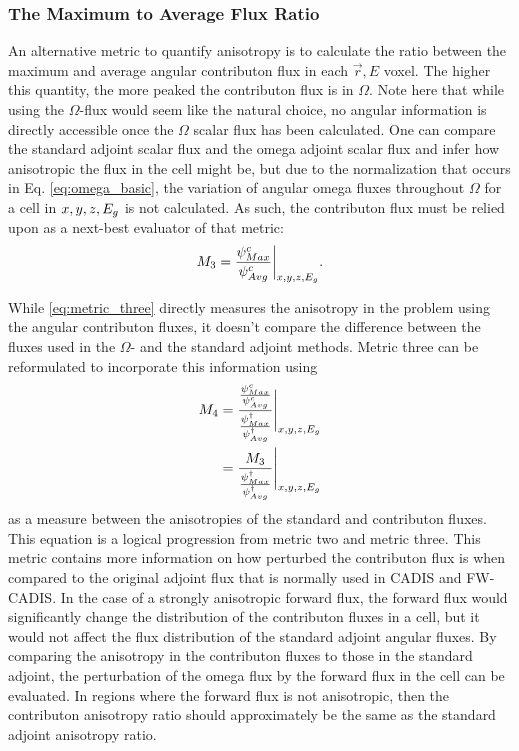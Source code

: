 \subsubsection{The Maximum to Average Flux Ratio}

An alternative metric to quantify anisotropy is to calculate the ratio between
the maximum and average angular contributon flux in each $\vec{r} , E$ voxel.
The higher this quantity, the more peaked the contributon flux is in $\Omega$.
Note here that while using the $\Omega$-flux would seem like the natural choice,
no angular information is directly accessible once the $\Omega$ scalar flux has
been calculated. One can compare the standard adjoint scalar flux and the omega
adjoint scalar flux and infer how anisotropic the flux in the cell might be, but
due to the normalization that occurs in Eq. \eqref{eq:omega_basic}, the
variation of angular omega fluxes throughout $\Omega$ for a cell
in $x,y,z,E_g$ is not
calculated. As such, the contributon flux must be relied
upon as a next-best evaluator of that metric:
%
\begin{equation}
  M_{3} = \frac{\psi^{c}_{Max}}{\psi^{c}_{
          Avg}}\bigg\rvert_{x,y,z,E_g}  .
  \label{eq:metric_three}
\end{equation}

While \eqref{eq:metric_three} directly measures the anisotropy in the problem using
the angular contributon fluxes, it doesn't compare the difference
between the fluxes used
in the $\Omega$-  and the standard adjoint methods. Metric three
can be
reformulated to incorporate this information using
%
\begin{equation}
  \begin{split}
    M_{4} & = \frac{\frac{\psi^{c}_{Max}}{\psi^{c}_{
                  Avg}}}{\frac{\psi^{\dagger}_{
                  Max}}{\psi^{\dagger}_{Avg}}} \Bigg\rvert_{x,y,z,E_g} \\
          & = \frac{M_{3}}{\frac{\psi^{\dagger}_{Max}}
                  {\psi^{\dagger}_{Avg}}} \Bigg\rvert_{x,y,z,E_g}
  \end{split}
  \label{eq:metric_four}
\end{equation}
%
as a measure between the anisotropies of the standard and contributon fluxes.
This equation is a logical progression from metric two and
metric three. This metric contains more information on how perturbed the
contributon flux is when compared to the original adjoint flux that is normally
used in CADIS and FW-CADIS.
In the case of a strongly anisotropic
forward flux, the forward flux  would significantly
change the distribution of the contributon
fluxes in a cell, but it would not affect the flux distribution of the standard
adjoint angular fluxes. By comparing the anisotropy in the contributon
fluxes to those in the standard adjoint, the perturbation of the omega flux by
the forward flux
in the cell can be evaluated. In regions where the forward flux is
not anisotropic, then the contributon anisotropy ratio should approximately be
the same as the standard adjoint anisotropy ratio.

